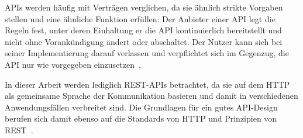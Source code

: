 \acp{API} werden häufig mit Verträgen verglichen, da sie ähnlich strikte Vorgaben stellen und eine ähnliche Funktion erfüllen:
Der Anbieter einer \ac{API} legt die Regeln fest, unter deren Einhaltung er die \ac{API} kontinuierlich bereitstellt und nicht ohne Vorankündigung ändert oder abschaltet.
Der Nutzer kann sich bei seiner Implementierung darauf verlassen und verpflichtet sich im Gegenzug, die \ac{API} nur wie vorgegeben einzusetzen~\cites[1627]{cha21}{ope23a}.

In dieser Arbeit werden lediglich \acs{REST}-\acp{API} betrachtet, da sie auf dem \acf{HTTP} als gemeinsame Sprache der Kommunikation basieren und damit in verschiedenen Anwendungsfällen verbreitet sind.
Die Grundlagen für ein gutes \ac{API}-Design berufen sich damit ebenso auf die Standards von \ac{HTTP} und Prinzipien von \ac{REST}~\cite[1628]{cha21}.